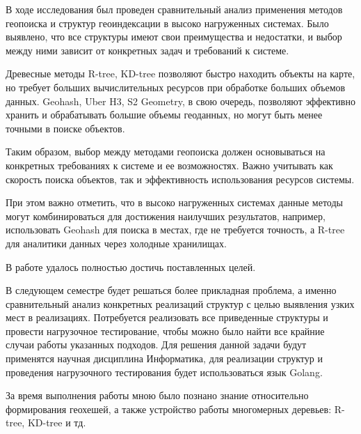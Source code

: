 \Conclusion

В ходе исследования был проведен сравнительный анализ применения методов геопоиска и структур геоиндексации в высоко нагруженных системах. Было выявлено, что все структуры имеют свои преимущества и недостатки, и выбор между ними зависит от конкретных задач и требований к системе.

Древесные методы R-tree, KD-tree позволяют быстро находить объекты на карте, но требует больших вычислительных ресурсов при обработке больших объемов данных. Geohash, Uber H3, S2 Geometry, в свою очередь, позволяют эффективно хранить и обрабатывать большие объемы геоданных, но могут быть менее точными в поиске объектов.

Таким образом, выбор между методами геопоиска должен основываться на конкретных требованиях к системе и ее возможностях. Важно учитывать как скорость поиска объектов, так и эффективность использования ресурсов системы.

При этом важно отметить, что в высоко нагруженных системах данные методы могут комбинироваться для достижения наилучших результатов, например, использовать Geohash для поиска в местах, где не требуется точность, а R-tree для аналитики данных через холодные хранилищах.

В работе удалось полностью достичь поставленных целей.

В следующем семестре будет решаться более прикладная проблема, а именно сравнительный анализ конкретных реализаций структур с целью выявления узких мест в реализациях. Потребуется реализовать все приведенные структуры и провести нагрузочное тестирование, чтобы можно было найти все крайние случаи работы указанных подходов. Для решения данной задачи будут применятся научная дисциплина Информатика, для реализации структур и проведения нагрузочного тестирования будет использоваться язык Golang.

За время выполнения работы мною было познано знание относительно формирования геохешей, а также устройство работы многомерных деревьев: R-tree, KD-tree и тд.
